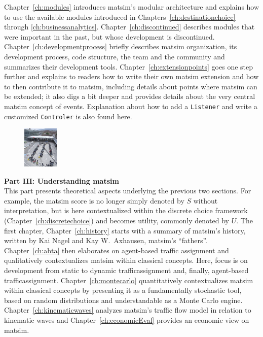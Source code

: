 Chapter~\ref{ch:modules} introduces \gls{matsim}'s modular architecture and explains how to use the available \glspl{module} introduced in Chapters~\ref{ch:destinationchoice} through \ref{ch:businessanalytics}. Chapter~\ref{ch:discontinued} describes modules that were important in the past, but whose development is discontinued.
Chapter~\ref{ch:developmentprocess} briefly describes \gls{matsim} organization, \ie its development process, code structure, the team and the community and summarizes their development tools. 
Chapter~\ref{ch:extensionpoints} goes one step further and explains to readers how to write their own \gls{matsim} \gls{extension} and how to then contribute it to \gls{matsim}, including details about points where \gls{matsim} can be extended; it also digs a bit deeper and provides details about the very central \gls{matsim} concept of \glspl{event}. Explanation about  how to add a \lstinline|Listener| and write a customized \lstinline|Controler| is also found here.

\begin{figure}
\vspace{-10pt}
  \begin{center}
    \includegraphics[width=0.15\textwidth]{images/DSCF5900.jpg}
  \end{center}
\end{figure}
\textbf{Part III: Understanding \acrshort{matsim}}\\
%
This part presents theoretical aspects underlying the previous two sections. For example, the \gls{matsim} \gls{score} is no longer simply denoted by $S$ without interpretation, but is here contextualized within the discrete choice framework (Chapter~\ref{ch:discretechoice}) and becomes \gls{utility}, commonly denoted by $U$. 
The first chapter, Chapter~\ref{ch:history} starts with a summary of \gls{matsim}'s history, written by Kai Nagel and Kay W.\ Axhausen, \gls{matsim}'s ``fathers''. 
Chapter~\ref{ch:abta} then elaborates on agent-based traffic assignment and qualitatively contextualizes \gls{matsim} within classical concepts. Here, focus is on development from static to dynamic \gls{trafficassignment} and, finally, agent-based \gls{trafficassignment}.  
Chapter~\ref{ch:montecarlo} quantitatively contextualizes \gls{matsim} within classical concepts by presenting it as a fundamentally stochastic tool, based on random distributions and understandable as a Monte Carlo engine.
Chapter~\ref{ch:kinematicwaves} analyzes \gls{matsim}'s traffic flow model in relation to kinematic waves and Chapter~\ref{ch:economicEval} provides an economic view on \gls{matsim}. 

